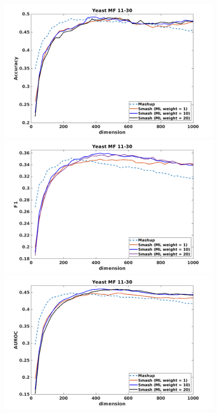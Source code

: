 \documentclass[12pt]{amsart}
\theoremstyle{remark}
\theoremstyle{definition}
\numberwithin{equation}{section} \numberwithin{table}{section}
\numberwithin{figure}{section}
\numberwithin{algorithm}{section}
\numberwithin{theorem}{section}
\begin{document}
\begin{figure}[h!]
	\centering
	\includegraphics[width=.8\linewidth]{Yeast-MF-11-30-Acc}  \\
	\includegraphics[width=.8\linewidth]{Yeast-MF-11-30-F1}  \\
	\includegraphics[width=.8\linewidth]{Yeast-MF-11-30-AUROC} 
\end{figure}
\end{document}
